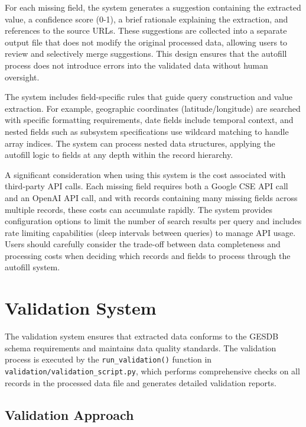 \documentclass[11pt]{article}
\begin{document}
For each missing field, the system generates a suggestion containing the extracted value, a confidence score (0-1), a brief rationale explaining the extraction, and references to the source URLs. These suggestions are collected into a separate output file that does not modify the original processed data, allowing users to review and selectively merge suggestions. This design ensures that the autofill process does not introduce errors into the validated data without human oversight.

The system includes field-specific rules that guide query construction and value extraction. For example, geographic coordinates (latitude/longitude) are searched with specific formatting requirements, date fields include temporal context, and nested fields such as subsystem specifications use wildcard matching to handle array indices. The system can process nested data structures, applying the autofill logic to fields at any depth within the record hierarchy.

A significant consideration when using this system is the cost associated with third-party API calls. Each missing field requires both a Google CSE API call and an OpenAI API call, and with records containing many missing fields across multiple records, these costs can accumulate rapidly. The system provides configuration options to limit the number of search results per query and includes rate limiting capabilities (sleep intervals between queries) to manage API usage. Users should carefully consider the trade-off between data completeness and processing costs when deciding which records and fields to process through the autofill system.

\section{Validation System}
\label{sec:validation}

The validation system ensures that extracted data conforms to the GESDB schema requirements and maintains data quality standards. The validation process is executed by the \texttt{run\_validation()} function in \texttt{validation/validation\_script.py}, which performs comprehensive checks on all records in the processed data file and generates detailed validation reports.

\subsection{Validation Approach}
\end{document}
